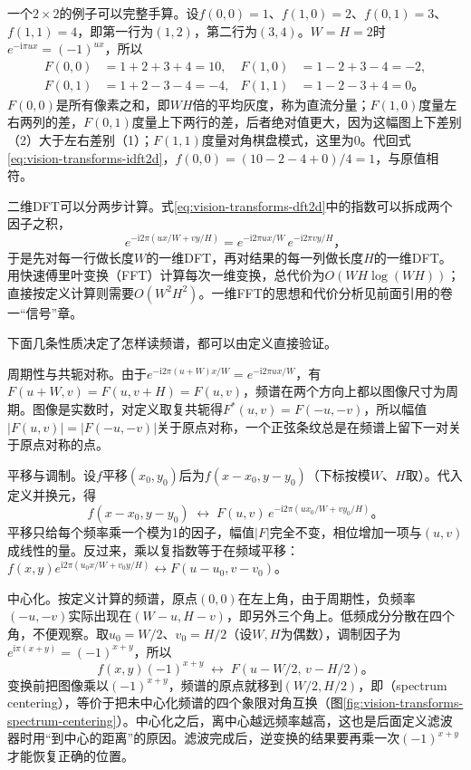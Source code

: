 一个$2\times2$的例子可以完整手算。设$f(0,0)=1$、$f(1,0)=2$、$f(0,1)=3$、$f(1,1)=4$，即第一行为$(1,2)$，第二行为$(3,4)$。$W=H=2$时$e^{-\mathrm{i}\pi ux}=(-1)^{ux}$，所以
\[
  \begin{aligned}
  F(0,0)&=1+2+3+4=10, & F(1,0)&=1-2+3-4=-2,\\
  F(0,1)&=1+2-3-4=-4, & F(1,1)&=1-2-3+4=0\text{。}
  \end{aligned}
\]
$F(0,0)$是所有像素之和，即$WH$倍的平均灰度，称为直流分量；$F(1,0)$度量左右两列的差，$F(0,1)$度量上下两行的差，后者绝对值更大，因为这幅图上下差别（2）大于左右差别（1）；$F(1,1)$度量对角棋盘模式，这里为0。代回式\eqref{eq:vision-transforms-idft2d}，$f(0,0)=(10-2-4+0)/4=1$，与原值相符。

二维DFT可以分两步计算。式\eqref{eq:vision-transforms-dft2d}中的指数可以拆成两个因子之积，
\[
  e^{-\mathrm{i}2\pi(ux/W+vy/H)}=e^{-\mathrm{i}2\pi ux/W}\,e^{-\mathrm{i}2\pi vy/H}\text{，}
\]
于是先对每一行做长度$W$的一维DFT，再对结果的每一列做长度$H$的一维DFT。用快速傅里叶变换（FFT）计算每次一维变换，总代价为$O(WH\log(WH))$；直接按定义计算则需要$O(W^2H^2)$。一维FFT的思想和代价分析见前面引用的卷一“信号”章。

下面几条性质决定了怎样读频谱，都可以由定义直接验证。

周期性与共轭对称。由于$e^{-\mathrm{i}2\pi(u+W)x/W}=e^{-\mathrm{i}2\pi ux/W}$，有$F(u+W,v)=F(u,v+H)=F(u,v)$，频谱在两个方向上都以图像尺寸为周期。图像是实数时，对定义取复共轭得$F^{*}(u,v)=F(-u,-v)$，所以幅值$|F(u,v)|=|F(-u,-v)|$关于原点对称，一个正弦条纹总是在频谱上留下一对关于原点对称的点。

平移与调制。设$f$平移$(x_0,y_0)$后为$f(x-x_0,y-y_0)$（下标按模$W$、$H$取）。代入定义并换元，得
\begin{equation}
  f(x-x_0,y-y_0)\;\longleftrightarrow\;
  F(u,v)\,e^{-\mathrm{i}2\pi(ux_0/W+vy_0/H)}\text{。}
  \label{eq:vision-transforms-shift}
\end{equation}
平移只给每个频率乘一个模为1的因子，幅值$|F|$完全不变，相位增加一项与$(u,v)$成线性的量。反过来，乘以复指数等于在频域平移：$f(x,y)e^{\mathrm{i}2\pi(u_0x/W+v_0y/H)}\leftrightarrow F(u-u_0,v-v_0)$。

中心化。按定义计算的频谱，原点$(0,0)$在左上角，由于周期性，负频率$(-u,-v)$实际出现在$(W-u,H-v)$，即另外三个角上。低频成分分散在四个角，不便观察。取$u_0=W/2$、$v_0=H/2$（设$W,H$为偶数），调制因子为$e^{\mathrm{i}\pi(x+y)}=(-1)^{x+y}$，所以
\begin{equation}
  f(x,y)(-1)^{x+y}\;\longleftrightarrow\;F(u-W/2,\,v-H/2)\text{。}
  \label{eq:vision-transforms-centering}
\end{equation}
变换前把图像乘以$(-1)^{x+y}$，频谱的原点就移到$(W/2,H/2)$，即（spectrum centering），等价于把未中心化频谱的四个象限对角互换（图\ref{fig:vision-transforms-spectrum-centering}）。中心化之后，离中心越远频率越高，这也是后面定义滤波器时用“到中心的距离”的原因。滤波完成后，逆变换的结果要再乘一次$(-1)^{x+y}$才能恢复正确的位置。

